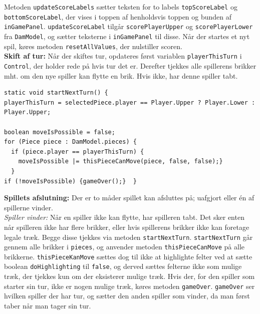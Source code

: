 Metoden \texttt{updateScoreLabels} sætter teksten for to labels \texttt{topScoreLabel} og \texttt{bottomScoreLabel}, der vises i toppen af henholdsvis toppen og bunden af \texttt{inGamePanel}. \texttt{updateScoreLabel} tilgår \texttt{scorePlayerUpper} og \texttt{scorePlayerLower} fra \texttt{DamModel}, og sætter teksterne i \texttt{inGamePanel} til disse. Når der startes et nyt spil, køres metoden \texttt{resetAllValues}, der nulstiller scoren.\\

\textbf{Skift af tur:} Når der skiftes tur, opdateres først variablen \texttt{playerThisTurn} i \texttt{Control}, der holder rede på hvis tur det er. Derefter tjekkes alle spillerens brikker mht. om den nye spiller kan flytte en brik. Hvis ikke, har denne spiller tabt.

\begin{lstlisting}
static void startNextTurn() {
playerThisTurn = selectedPiece.player == Player.Upper ? Player.Lower : Player.Upper;	

boolean moveIsPossible = false;		
for (Piece piece : DamModel.pieces) {
  if (piece.player == playerThisTurn) {
    moveIsPossible |= thisPieceCanMove(piece, false, false);} 
  }
if (!moveIsPossible) {gameOver();}  }
\end{lstlisting}

\textbf{Spillets afslutning:} Der er to måder spillet kan afsluttes på; uafgjort eller én af spillerne vinder. \\
\textit{Spiller vinder:}  Når en spiller ikke kan flytte, har spilleren tabt. Det sker enten når spilleren ikke har flere brikker, eller hvis spillerens brikker ikke kan foretage legale træk. Begge disse tjekkes via metoden \texttt{startNextTurn}. \texttt{startNextTurn} går gennem alle brikker i \texttt{pieces}, og anvender metoden \texttt{thisPieceCanMove} på alle brikkerne. \texttt{thisPieceKanMove} sættes dog til ikke at highlighte felter ved at sætte boolean \texttt{doHighlighting} til \texttt{false}, og derved sættes felterne ikke som mulige træk, der tjekkes kun om der eksisterer mulige træk. Hvis der, for den spiller som starter sin tur, ikke er nogen mulige træk, køres metoden \texttt{gameOver}. \texttt{gameOver} ser hvilken spiller der har tur, og sætter den anden spiller som vinder, da man først taber når man tager sin tur.

